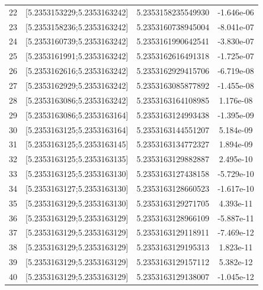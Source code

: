 \documentclass[11pt, oneside]{article}   	%
\begin{document}
\begin{center}
\begin{tabular}{ |c|c|c|c| }
 22 & [5.2353153229;5.2353163242] & 5.2353158235549930 &   -1.646e-06 \\ 
 23 & [5.2353158236;5.2353163242] & 5.2353160738945004 &   -8.041e-07 \\ 
 24 & [5.2353160739;5.2353163242] & 5.2353161990642541 &   -3.830e-07 \\ 
 25 & [5.2353161991;5.2353163242] & 5.2353162616491318 &   -1.725e-07 \\ 
 26 & [5.2353162616;5.2353163242] & 5.2353162929415706 &   -6.719e-08 \\ 
 27 & [5.2353162929;5.2353163242] & 5.2353163085877892 &   -1.455e-08 \\ 
 28 & [5.2353163086;5.2353163242] & 5.2353163164108985 &    1.176e-08 \\ 
 29 & [5.2353163086;5.2353163164] & 5.2353163124993438 &   -1.395e-09 \\ 
 30 & [5.2353163125;5.2353163164] & 5.2353163144551207 &    5.184e-09 \\ 
 31 & [5.2353163125;5.2353163145] & 5.2353163134772327 &    1.894e-09 \\ 
 32 & [5.2353163125;5.2353163135] & 5.2353163129882887 &    2.495e-10 \\ 
 33 & [5.2353163125;5.2353163130] & 5.2353163127438158 &   -5.729e-10 \\ 
 34 & [5.2353163127;5.2353163130] & 5.2353163128660523 &   -1.617e-10 \\ 
 35 & [5.2353163129;5.2353163130] & 5.2353163129271705 &    4.393e-11 \\ 
 36 & [5.2353163129;5.2353163129] & 5.2353163128966109 &   -5.887e-11 \\ 
 37 & [5.2353163129;5.2353163129] & 5.2353163129118911 &   -7.469e-12 \\ 
 38 & [5.2353163129;5.2353163129] & 5.2353163129195313 &    1.823e-11 \\ 
 39 & [5.2353163129;5.2353163129] & 5.2353163129157112 &    5.382e-12 \\ 
 40 & [5.2353163129;5.2353163129] & 5.2353163129138007 &   -1.045e-12 \\ 
 \hline
\end{tabular}
\end{center}
\end{document}

